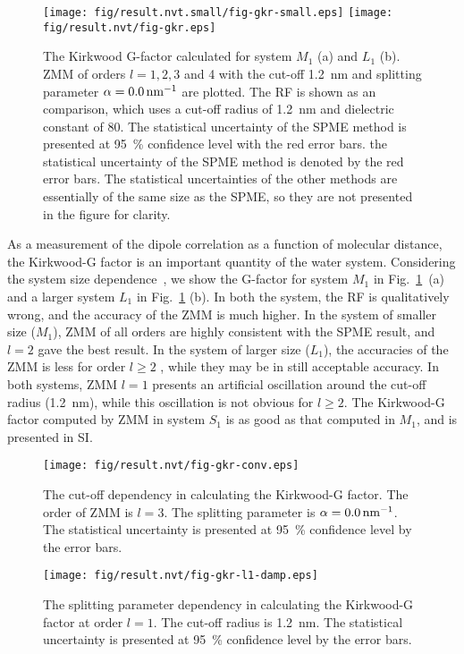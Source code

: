 \documentclass[a4paper,preprint,unsortedaddress,onecolumn,fleqn]{revtex4}
\begin{document}
\begin{figure}[tbp]
\centering
\texttt{[image: fig/result.nvt.small/fig-gkr-small.eps]}\newline
\texttt{[image: fig/result.nvt/fig-gkr.eps]}
\caption{The Kirkwood G-factor calculated for system $M_{1}$ (a) and $L_{1} $
(b). ZMM of orders $l=1,2,3$ and 4 with the cut-off 1.2~nm and splitting
parameter $\protect\alpha =0.0\,\text{nm}^{-1}$ are plotted. The RF is shown
as an comparison, which uses a cut-off radius of 1.2~nm and dielectric
constant of 80. The statistical uncertainty of the SPME method is presented
at 95~\% confidence level with the red error bars. the statistical
uncertainty of the SPME method is denoted by the red error bars. The
statistical uncertainties of the other methods are essentially of the same
size as the SPME, so they are not presented in the figure for clarity.}
\label{fig:gkr}
\end{figure}

As a measurement of the dipole correlation as a function of molecular
distance, the Kirkwood-G factor is an important quantity of the water
system. Considering the system size dependence~\cite{vanderSpoel2006origin},
we show the G-factor for system $M_{1}$ in Fig.~\ref{fig:gkr}~(a) and a
larger system $L_{1}$ in Fig.~\ref{fig:gkr} (b). In both the system, the RF
is qualitatively wrong, and the accuracy of the ZMM is much higher. In the
system of smaller size ($M_{1}$), ZMM of all orders are highly consistent
with the SPME result, and $l=2$ gave the best result. In the system of
larger size ($L_{1}$), the accuracies of the ZMM is less for order $l\geq 2$%
, while they may be in still acceptable accuracy. In both systems, ZMM $l=1$
presents an artificial oscillation around the cut-off radius (1.2~nm), while
this oscillation is not obvious for $l\geq 2$. The Kirkwood-G factor
computed by ZMM in system $S_{1}$ is as good as that computed in $M_{1}$,
and is presented in SI.

\begin{figure}[tbp]
\centering
\texttt{[image: fig/result.nvt/fig-gkr-conv.eps]}
\caption{ The cut-off dependency in calculating the Kirkwood-G factor. The
order of ZMM is $l=3$. The splitting parameter is $\protect\alpha =0.0\,%
\text{nm}^{-1}$. The statistical uncertainty is presented at 95~\%
confidence level by the error bars. }
\label{fig:gkr-conv}
\end{figure}

\begin{figure}[tbp]
\centering
\texttt{[image: fig/result.nvt/fig-gkr-l1-damp.eps]}
\caption{ The splitting parameter dependency in calculating the Kirkwood-G
factor at order $l=1$. The cut-off radius is 1.2~nm. The statistical
uncertainty is presented at 95~\% confidence level by the error bars. }
\label{fig:gkr-damp-l1}
\end{figure}
\end{document}
